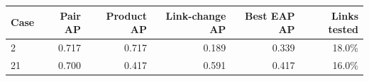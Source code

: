 \begin{tabular}{lrrrrr}
\toprule
Case & Pair AP & Product AP & Link-change AP & Best EAP AP & Links tested \\
\midrule
2 & 0.717 & 0.717 & 0.189 & 0.339 & 18.0\% \\
21 & 0.700 & 0.417 & 0.591 & 0.417 & 16.0\% \\
\bottomrule
\end{tabular}
